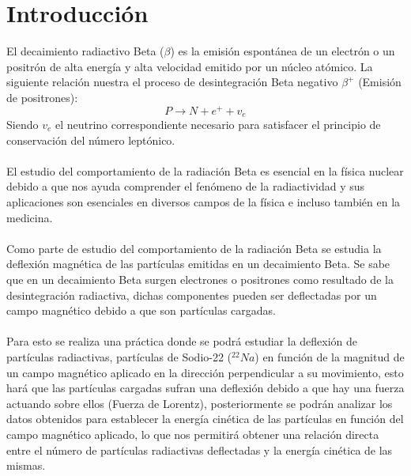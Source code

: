 \documentclass[10pt,twocolumns,letterpaper]{article}
\begin{document}
\section{Introducción}
El decaimiento radiactivo Beta ($\beta$) es la emisión espontánea de un electrón o un positrón de alta energía y alta velocidad emitido por un núcleo atómico. La siguiente relación nuestra el proceso de desintegración Beta negativo $\beta^{+}$ (Emisión de positrones):
\begin{equation} \label{eqn_1}
    P \longrightarrow N+e^{+}+{v}_e
\end{equation}
Siendo ${v}_{e}$ el neutrino correspondiente necesario para satisfacer el principio de conservación del número leptónico.\\ \\  El estudio del comportamiento de la radiación Beta es esencial en la física nuclear debido a que nos ayuda comprender el fenómeno de la radiactividad y sus aplicaciones son esenciales en diversos campos de la física e incluso también en la medicina. \\ \\
Como parte de estudio del comportamiento de la radiación Beta se estudia la deflexión magnética de las partículas emitidas en un decaimiento Beta. Se sabe que en un decaimiento Beta surgen electrones o positrones como resultado de la desintegración radiactiva, dichas componentes pueden ser deflectadas por un campo magnético debido a que son partículas cargadas. \\ \\ 
Para esto se realiza una práctica donde se podrá estudiar la deflexión de partículas radiactivas, partículas de Sodio-22 ($^{22}Na$) en función de la magnitud de un campo magnético aplicado en la dirección perpendicular a su movimiento, esto hará que las partículas cargadas sufran una deflexión debido a que hay una fuerza actuando sobre ellos (Fuerza de Lorentz), posteriormente se podrán analizar los datos obtenidos para establecer la energía cinética de las partículas en función del campo magnético aplicado, lo que nos permitirá obtener una relación directa entre el número de partículas radiactivas deflectadas y la energía cinética de las mismas.
\end{document}

